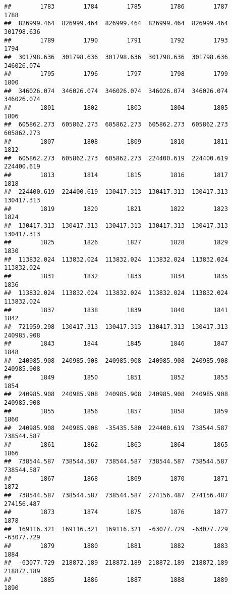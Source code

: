 \documentclass[
]{book}
\begin{document}
\begin{verbatim}
##        1783        1784        1785        1786        1787        1788 
##  826999.464  826999.464  826999.464  826999.464  826999.464  301798.636 
##        1789        1790        1791        1792        1793        1794 
##  301798.636  301798.636  301798.636  301798.636  301798.636  346026.074 
##        1795        1796        1797        1798        1799        1800 
##  346026.074  346026.074  346026.074  346026.074  346026.074  346026.074 
##        1801        1802        1803        1804        1805        1806 
##  605862.273  605862.273  605862.273  605862.273  605862.273  605862.273 
##        1807        1808        1809        1810        1811        1812 
##  605862.273  605862.273  605862.273  224400.619  224400.619  224400.619 
##        1813        1814        1815        1816        1817        1818 
##  224400.619  224400.619  130417.313  130417.313  130417.313  130417.313 
##        1819        1820        1821        1822        1823        1824 
##  130417.313  130417.313  130417.313  130417.313  130417.313  130417.313 
##        1825        1826        1827        1828        1829        1830 
##  113832.024  113832.024  113832.024  113832.024  113832.024  113832.024 
##        1831        1832        1833        1834        1835        1836 
##  113832.024  113832.024  113832.024  113832.024  113832.024  113832.024 
##        1837        1838        1839        1840        1841        1842 
##  721959.298  130417.313  130417.313  130417.313  130417.313  240985.908 
##        1843        1844        1845        1846        1847        1848 
##  240985.908  240985.908  240985.908  240985.908  240985.908  240985.908 
##        1849        1850        1851        1852        1853        1854 
##  240985.908  240985.908  240985.908  240985.908  240985.908  240985.908 
##        1855        1856        1857        1858        1859        1860 
##  240985.908  240985.908  -35435.580  224400.619  738544.587  738544.587 
##        1861        1862        1863        1864        1865        1866 
##  738544.587  738544.587  738544.587  738544.587  738544.587  738544.587 
##        1867        1868        1869        1870        1871        1872 
##  738544.587  738544.587  738544.587  274156.487  274156.487  274156.487 
##        1873        1874        1875        1876        1877        1878 
##  169116.321  169116.321  169116.321  -63077.729  -63077.729  -63077.729 
##        1879        1880        1881        1882        1883        1884 
##  -63077.729  218872.189  218872.189  218872.189  218872.189  218872.189 
##        1885        1886        1887        1888        1889        1890 

\end{verbatim}
\end{document}
